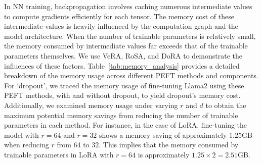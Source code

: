 In NN training, backpropagation involves caching numerous intermediate values to compute gradients efficiently for each tensor. The memory cost of these intermediate values is heavily influenced by the computation graph and the model architecture. When the number of trainable parameters is relatively small, the memory consumed by intermediate values far exceeds that of the trainable parameters themselves. We use VeRA, RoSA, and DoRA to demonstrate the influences of these factors. Table~\ref{tab:memory_analysis} provides a detailed breakdown of the memory usage across different PEFT methods and components. %
For `dropout', we traced the memory usage of fine-tuning Llama2 using these PEFT methods, with and without dropout, to yield dropout's memory cost. Additionally, we examined memory usage under varying $r$ and $d$ to obtain the maximum potential memory savings from reducing the number of trainable parameters in each method. For instance, in the case of LoRA, fine-tuning the model with $r=64$ and $r=32$ shows a memory saving of approximately $1.25$GB when reducing $r$ from $64$ to $32$. This implies that the memory consumed by trainable parameters in LoRA with $r=64$ is approximately $1.25 \times 2 = 2.51$GB.

